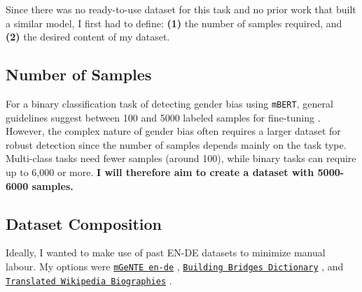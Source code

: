Since there was no ready-to-use dataset for this task and no prior work that built a similar model, I first had to define: \textbf{(1)} the number of samples required,  and \textbf{(2)} the desired content of my dataset.

\subsection{Number of Samples}
For a binary classification task of detecting gender bias using \texttt{mBERT}, general guidelines suggest between 100 and 5000 labeled samples for fine-tuning \citep{pecherComparingSpecialisedSmall2024}. However, the complex nature of gender bias often requires a larger dataset for robust detection since the number of samples depends mainly on the task type. Multi-class tasks need fewer samples (around 100), while binary tasks can require up to 6,000 or more. \textbf{I will therefore aim to create a dataset with 5000-6000 samples.}

\subsection{Dataset Composition}
Ideally, I wanted to make use of past EN-DE datasets to minimize manual labour. My options were \texttt{\href{https://huggingface.co/datasets/FBK-MT/mGeNTE}{mGeNTE en-de}} \citep{savoldiMGeNTEMultilingualResource2025}, \texttt{\href{https://github.com/g8a9/building-bridges-gender-fair-german-mt}{Building Bridges Dictionary}} \citep{lardelliBuildingBridgesDataset2024}, and \texttt{\href{https://research.google/blog/a-dataset-for-studying-gender-bias-in-translation/}{Translated Wikipedia Biographies}} \citep{stellaDatasetStudyingGender2021}.

